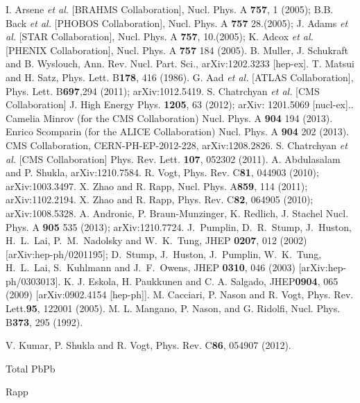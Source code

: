 \documentclass[aps,prc,preprint,superscriptaddress,showpacs,showkeys]{revtex4-1}
\begin{document}
\noindent
\begin{thebibliography}{100}
\medskip
{} I. Arsene {\it et al.} [BRAHMS Collaboration], Nucl. Phys. A {\bf 757}, 1 (2005); 
  B.B. Back {\it et al.} [PHOBOS Collaboration], Nucl. Phys. A {\bf 757} 28.(2005); 
  J. Adams {\it et al.} [STAR Collaboration], Nucl. Phys. A {\bf 757}, 10.(2005); 
  K. Adcox {\it et al.} [PHENIX Collaboration], Nucl. Phys. A {\bf 757} 184 (2005).
 B. Muller, J. Schukraft and B. Wyslouch, Ann. Rev. Nucl. Part. Sci., arXiv:1202.3233 [hep-ex].
 T. Matsui and H. Satz, Phys. Lett. B{\bf 178}, 416 (1986).
 G. Aad {\it et al.} [ATLAS Collaboration], Phys. Lett. B{\bf 697},294 (2011); arXiv:1012.5419.
 S. Chatrchyan {\it et al.} [CMS Collaboration] J. High Energy Phys. {\bf 1205}, 63 (2012);  arXiv: 1201.5069 [nucl-ex]..
 Camelia Minrov (for the CMS Collaboration) Nucl. Phys. A {\bf 904} 194 (2013).
 Enrico Scomparin (for the ALICE Collaboration) Nucl. Phys. A {\bf 904} 202 (2013).
 CMS Collaboration, CERN-PH-EP-2012-228, arXiv:1208.2826.
 S. Chatrchyan {\it et al.} [CMS Collaboration] Phys. Rev. Lett. {\bf 107}, 052302 (2011).
 A. Abdulasalam and P. Shukla, arXiv:1210.7584.
 R. Vogt, Phys. Rev. C{\bf 81}, 044903 (2010); arXiv:1003.3497.
 X. Zhao and R. Rapp, Nucl. Phys. A{\bf 859}, 114 (2011); arXiv:1102.2194. 
 X. Zhao and R. Rapp, Phys. Rev. C{\bf 82}, 064905 (2010); arXiv:1008.5328.
 A. Andronic, P. Braun-Munzinger, K. Redlich, J. Stachel Nucl. Phys. A {\bf 905} 535 (2013); arXiv:1210.7724.
 J.~Pumplin, D.~R.~Stump, J.~Huston, H.~L.~Lai, P.~M.~Nadolsky 
and W.~K.~Tung,  JHEP {\bf 0207}, 012 (2002) [arXiv:hep-ph/0201195];
  D.~Stump, J.~Huston, J.~Pumplin, W.~K.~Tung, H.~L.~Lai, S.~Kuhlmann  and J.~F.~Owens,
  JHEP {\bf 0310}, 046 (2003)  [arXiv:hep-ph/0303013].
 K. J. Eskola, H. Paukkunen and C. A. Salgado, JHEP{\bf 0904}, 065 (2009) [arXiv:0902.4154 [hep-ph]].
 M. Cacciari, P. Nason and R. Vogt, Phys. Rev. Lett.{\bf 95}, 122001 (2005).
 M. L. Mangano, P. Nason, and G. Ridolfi, Nucl. Phys. B{\bf 373}, 295 (1992).

 V. Kumar, P. Shukla and R. Vogt, Phys. Rev. C{\bf 86}, 054907 (2012).

 Total PbPb

 Rapp 


\end{thebibliography}
\end{document}
